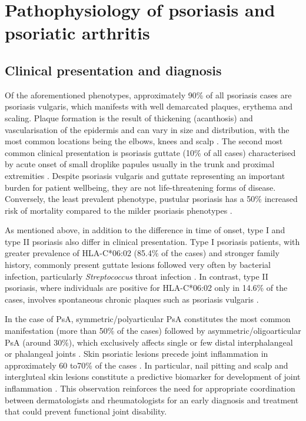 \section{Pathophysiology of psoriasis and psoriatic arthritis}

\subsection{Clinical presentation and diagnosis}
%
Of the aforementioned phenotypes, approximately 90\% of all psoriasis cases are psoriasis vulgaris, which manifests with well demarcated plaques, erythema and scaling. Plaque formation is the result of thickening (acanthosis) and vascularisation of the epidermis and can vary in size and distribution, with the most common locations being the elbows, knees and scalp \parencite{ Perera2012,Griffiths2007}. The second most common clinical presentation is psoriasis guttate (10\% of all cases) characterised by acute onset of small droplike papules usually in the trunk and proximal extremities \parencite{Vence2015}. Despite psoriasis vulgaris and guttate representing an important burden for patient wellbeing, they are not life-threatening forms of disease. Conversely, the least prevalent phenotype, pustular psoriasis has a 50\% increased risk of mortality compared to the milder psoriasis phenotypes \parencite{Gelfand2007,Moura2015}.  

As mentioned above, in addition to the difference in time of onset, type I and type II psoriasis also differ in clinical presentation. Type I psoriasis patients, with greater prevalence of HLA-C*06:02 (85.4\% of the cases) and stronger family history, commonly present guttate lesions followed very often by bacterial infection, particularly \textit{Streptococcus} throat infection \parencite{}. In contrast, type II psoriasis, where individuals are positive for HLA-C*06:02 only in 14.6\% of the cases, involves spontaneous chronic plaques such as psoriasis vulgaris \parencite{Perera2012}. 


In the case of PsA, symmetric/polyarticular PsA constitutes the most common manifestation (more than 50\% of the cases) followed by asymmetric/oligoarticular PsA (around 30\%), which exclusively affects single or few distal interphalangeal or phalangeal joints \parencite{Reich2009, McGonagle2011}. Skin psoriatic lesions precede joint inflammation in approximately 60 to70\% of the cases \parencite{Gladman2005, McGonagle2011}. In particular, nail pitting and scalp and intergluteal skin lesions constitute a predictive biomarker for development of joint inflammation \parencite{Moll1976,Griffiths2007,McGonagle,2011}. This observation reinforces the need for appropriate coordination between dermatologists and rheumatologists for an early diagnosis and treatment that could prevent functional joint disability.

